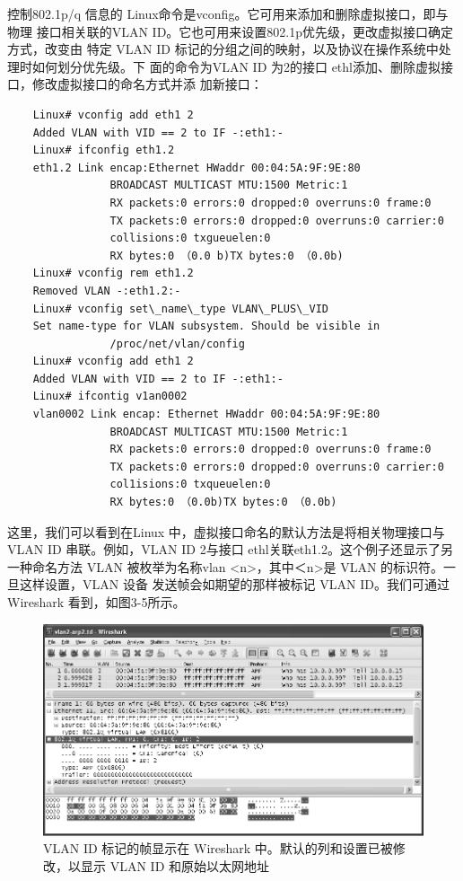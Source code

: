 控制802.1p/q 信息的 Linux命令是vconfig。它可用来添加和删除虚拟接口，即与物理
接口相关联的VLAN ID。它也可用来设置802.1p优先级，更改虚拟接口确定方式，改变由
特定 VLAN ID 标记的分组之间的映射，以及协议在操作系统中处理时如何划分优先级。下
面的命令为VLAN ID 为2的接口 ethl添加、删除虚拟接口，修改虚拟接口的命名方式并添
加新接口：
\begin{verbatim}
    Linux# vconfig add eth1 2
    Added VLAN with VID == 2 to IF -:eth1:-
    Linux# ifconfig eth1.2
    eth1.2 Link encap:Ethernet HWaddr 00:04:5A:9F:9E:80
                BROADCAST MULTICAST MTU:1500 Metric:1
                RX packets:0 errors:0 dropped:0 overruns:0 frame:0
                TX packets:0 errors:0 dropped:0 overruns:0 carrier:0
                collisions:0 txgueuelen:0
                RX bytes:0 （0.0 b)TX bytes:0 （0.0b)
    Linux# vconfig rem eth1.2
    Removed VLAN -:eth1.2:-
    Linux# vconfig set\_name\_type VLAN\_PLUS\_VID
    Set name-type for VLAN subsystem. Should be visible in
                /proc/net/vlan/config
    Linux# vconfig add eth1 2
    Added VLAN with VID == 2 to IF -:eth1:-
    Linux# ifcontig v1an0002
    vlan0002 Link encap: Ethernet HWaddr 00:04:5A:9F:9E:80
                BROADCAST MULTICAST MTU:1500 Metric:1
                RX packets:0 errors:0 dropped:0 overruns:0 frame:0
                TX packets:0 errors:0 dropped:0 overruns:0 carrier:0
                col1isions:0 txqueuelen:0
                RX bytes:0 （0.0b)TX bytes:0 （0.0b)
\end{verbatim}

这里，我们可以看到在Linux 中，虚拟接口命名的默认方法是将相关物理接口与 VLAN
ID 串联。例如，VLAN ID 2与接口 ethl关联eth1.2。这个例子还显示了另一种命名方法
VLAN 被枚举为名称vlan <n>，其中＜n>是 VLAN 的标识符。一旦这样设置，VLAN 设备
发送帧会如期望的那样被标记 VLAN ID。我们可通过 Wireshark 看到，如图3-5所示。

\begin{figure}
  \centering
  \includegraphics[scale=0.5]{imgs/3/3-5.png}
  \caption{VLAN ID 标记的帧显示在 Wireshark 中。默认的列和设置已被修改，以显示 VLAN ID 和原始以太网地址}
\end{figure}

